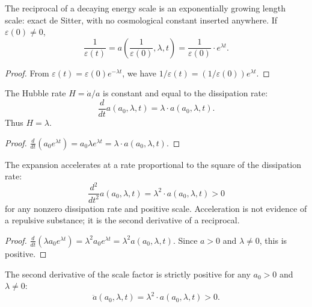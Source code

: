 \begin{theorem}
The reciprocal of a decaying energy scale is an exponentially growing length scale: exact de Sitter, with no cosmological constant inserted anywhere. If $\varepsilon(0) \neq 0$,
\begin{equation}
\frac{1}{\varepsilon(t)} = a\left(\frac{1}{\varepsilon(0)}, \lambda, t\right) = \frac{1}{\varepsilon(0)} \cdot e^{\lambda t} .
\end{equation}
\end{theorem}

\begin{proof}
From $\varepsilon(t) = \varepsilon(0) e^{-\lambda t}$, we have $1/\varepsilon(t) = (1/\varepsilon(0)) e^{\lambda t}$.
\end{proof}

\begin{theorem}
The Hubble rate $H = \dot{a}/a$ is constant and equal to the dissipation rate:
\begin{equation}
\frac{d}{dt} a(a_0, \lambda, t) = \lambda \cdot a(a_0, \lambda, t) .
\end{equation}
Thus $H = \lambda$.
\end{theorem}

\begin{proof}
$\frac{d}{dt}(a_0 e^{\lambda t}) = a_0 \lambda e^{\lambda t} = \lambda \cdot a(a_0, \lambda, t)$.
\end{proof}

\begin{theorem}
The expansion accelerates at a rate proportional to the square of the dissipation rate:
\begin{equation}
\frac{d^2}{dt^2} a(a_0, \lambda, t) = \lambda^2 \cdot a(a_0, \lambda, t) > 0
\end{equation}
for any nonzero dissipation rate and positive scale. Acceleration is not evidence of a repulsive substance; it is the second derivative of a reciprocal.
\end{theorem}

\begin{proof}
$\frac{d}{dt}(\lambda a_0 e^{\lambda t}) = \lambda^2 a_0 e^{\lambda t} = \lambda^2 a(a_0, \lambda, t)$. Since $a > 0$ and $\lambda \neq 0$, this is positive.
\end{proof}

\begin{theorem}
The second derivative of the scale factor is strictly positive for any $a_0 > 0$ and $\lambda \neq 0$:
\begin{equation}
\ddot{a}(a_0, \lambda, t) = \lambda^2 \cdot a(a_0, \lambda, t) > 0 .
\end{equation}
\end{theorem}

